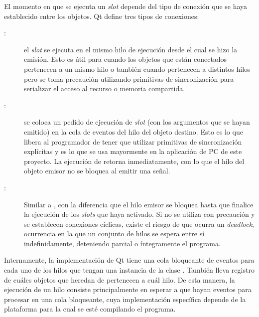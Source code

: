 El momento en que se ejecuta un \emph{slot} depende del tipo de conexión que se haya establecido entre los objetos. Qt define tres tipos de conexiones:
\begin{description}
	\item[:] el \emph{slot} se ejecuta en el mismo hilo de ejecución desde el cual se hizo la emisión. Esto es útil para cuando los objetos que están conectados pertenecen a un mismo hilo o también cuando pertenecen a distintos hilos pero se toma precaución utilizando primitivas de sincronización para serializar el acceso al recurso o memoria compartida.
	\item[:] se coloca un pedido de ejecución de \emph{slot} (con los argumentos que se hayan emitido) en la cola de eventos del hilo del objeto destino. Esto es lo que libera al programador de tener que utilizar primitivas de sincronización explícitas y es lo que se usa mayormente en la aplicación de PC de este proyecto. La ejecución de  retorna inmediatamente, con lo que el hilo del objeto emisor no se bloquea al emitir una señal.
	\item[:] Similar a , con la diferencia que el hilo emisor se bloquea hasta que finalice la ejecución de los \emph{slots} que haya activado. Si no se utiliza con precaución y se establecen conexiones cíclicas, existe el riesgo de que ocurra un \emph{deadlock}, ocurrencia en la que un conjunto de hilos se espera entre sí indefinidamente, deteniendo parcial o íntegramente el programa.
\end{description}

Internamente, la implementación de Qt tiene una cola bloqueante de eventos para cada uno de los hilos que tengan una instancia de la clase . También lleva registro de cuáles objetos que heredan de  pertenecen a cuál hilo. De esta manera, la ejecución de un hilo consiste principalmente en esperar a que hayan eventos para procesar en una cola bloqueante, cuya implementación específica depende de la plataforma para la cual se esté compilando el programa.

